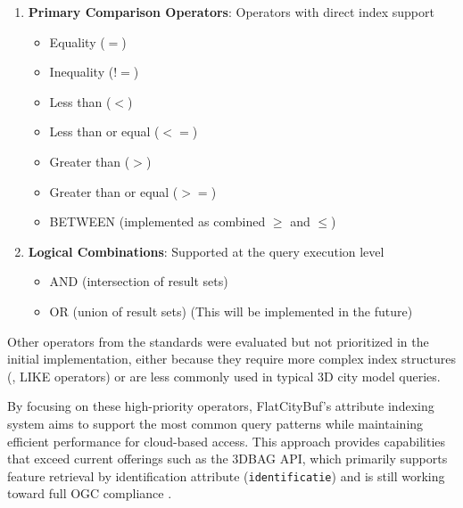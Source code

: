 \begin{enumerate}
  \item \textbf{Primary Comparison Operators}: Operators with direct index support
    \begin{itemize}
      \item Equality ($=$)
      \item Inequality ($!=$)
      \item Less than ($<$)
      \item Less than or equal ($<=$)
      \item Greater than ($>$)
      \item Greater than or equal ($>=$)
      \item BETWEEN (implemented as combined $\geq$ and $\leq$)
    \end{itemize}

  \item \textbf{Logical Combinations}: Supported at the query execution level
    \begin{itemize}
      \item AND (intersection of result sets)
      \item OR (union of result sets) (This will be implemented in the future)
    \end{itemize}

\end{enumerate}

Other operators from the standards were evaluated but not prioritized in the initial implementation, either because they require more complex index structures (\eg, LIKE operators) or are less commonly used in typical 3D city model queries.

By focusing on these high-priority operators, FlatCityBuf's attribute indexing system aims to support the most common query patterns while maintaining efficient performance for cloud-based access. This approach provides capabilities that exceed current offerings such as the 3DBAG API, which primarily supports feature retrieval by identification attribute (\texttt{identificatie}) and is still working toward full OGC compliance \citep{3dbag_api_2023}.


